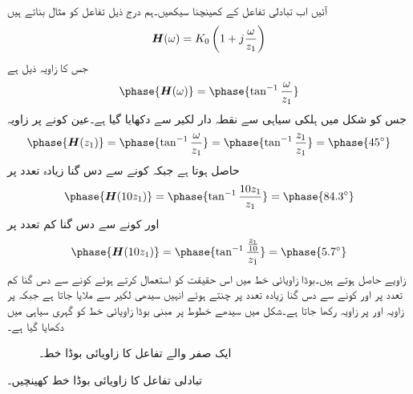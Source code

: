 آئیں اب تبادلی تفاعل کے  کھینچنا سیکھیں۔ہم درج ذیل تفاعل کو مثال بناتے ہیں
\begin{align}
{\ensuremath{{\boldsymbol{H}}}}(\omega)=K_0\left(1+j\frac{\omega}{z_1}\right)
\end{align}
جس کا زاویہ ذیل ہے
\begin{align}
\phase{\bH(\omega)}=\phase{\tan^{-1} \frac{\omega}{z_1}}
\end{align}
 جس کو شکل  میں ہلکی سیاہی سے نقطہ دار لکیر سے دکھایا گیا ہے۔عین کونے   پر زاویہ
\begin{align*}
\phase{\bH(z_1)}=\phase{\tan^{-1}\frac{\omega}{z_1}}=\phase{\tan^{-1} \frac{z_1}{z_1}}=\phase{45^{\circ}}
\end{align*}
حاصل ہوتا ہے جبکہ کونے سے دس گنا زیادہ تعدد  پر 
\begin{align*}
\phase{\bH(10 z_1)}=\phase{\tan^{-1} \frac{10 z_1}{z_1}}=\phase{84.3^{\circ}}
\end{align*}
 اور کونے سے دس گنا کم تعدد  پر 
\begin{align*}
\phase{\bH(10 z_1)}=\phase{\tan^{-1} \frac{\tfrac{z_1}{10}}{z_1}}=\phase{5.7^{\circ}}
\end{align*}
زاویے حاصل ہوتے ہیں۔بوڈا زاویائی خط میں اس حقیقت کو استعمال کرتے ہوئے کونے سے دس گنا کم تعدد  پر  اور کونے سے دس گنا زیادہ تعدد  پر  چنتے ہوئے انہیں سیدھی لکیر سے ملایا جاتا ہے جبکہ  پر زاویہ  اور  پر زاویہ  رکھا جاتا ہے۔شکل  میں سیدھے خطوط پر مبنی بوڈا زاویائی خط کو گہری سیاہی میں دکھایا گیا ہے۔
%
\begin{figure}
\centering
{}
\caption{ایک صفر والے تفاعل کا زاویائی بوڈا خط۔}
\label{شکل_تعددی_زاویائی_بوڈا_ایک_صفر_الف}
\end{figure}
تبادلی تفاعل  کا زاویائی بوڈا خط کھینچیں۔

